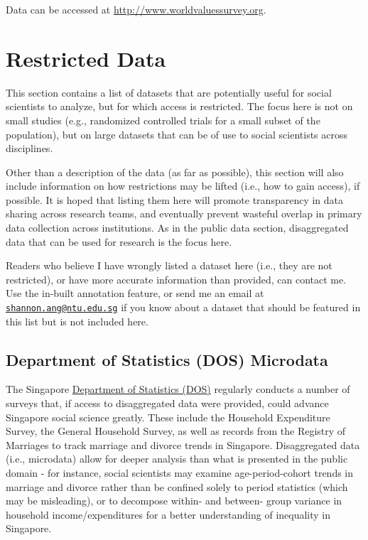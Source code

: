 \documentclass[
  openany]{book}
\begin{document}
Data can be accessed at \url{http://www.worldvaluessurvey.org}.

\hypertarget{restricteddata}{%
\chapter{Restricted Data}\label{restricteddata}}

This section contains a list of datasets that are potentially useful for social scientists to analyze, but for which access is restricted. The focus here is not on small studies (e.g., randomized controlled trials for a small subset of the population), but on large datasets that can be of use to social scientists across disciplines.

Other than a description of the data (as far as possible), this section will also include information on how restrictions may be lifted (i.e., how to gain access), if possible. It is hoped that listing them here will promote transparency in data sharing across research teams, and eventually prevent wasteful overlap in primary data collection across institutions. As in the public data section, disaggregated data that can be used for research is the focus here.

Readers who believe I have wrongly listed a dataset here (i.e., they are not restricted), or have more accurate information than provided, can contact me. Use the in-built annotation feature, or send me an email at \href{mailto:shannon.ang@ntu.edu.sg}{\nolinkurl{shannon.ang@ntu.edu.sg}} if you know about a dataset that should be featured in this list but is not included here.

\hypertarget{dos}{%
\section{Department of Statistics (DOS) Microdata}\label{dos}}

The Singapore \href{https://www.singstat.gov.sg}{Department of Statistics (DOS)} regularly conducts a number of surveys that, if access to disaggregated data were provided, could advance Singapore social science greatly. These include the Household Expenditure Survey, the General Household Survey, as well as records from the Registry of Marriages to track marriage and divorce trends in Singapore. Disaggregated data (i.e., microdata) allow for deeper analysis than what is presented in the public domain - for instance, social scientists may examine age-period-cohort trends in marriage and divorce rather than be confined solely to period statistics (which may be misleading), or to decompose within- and between- group variance in household income/expenditures for a better understanding of inequality in Singapore.
\end{document}
